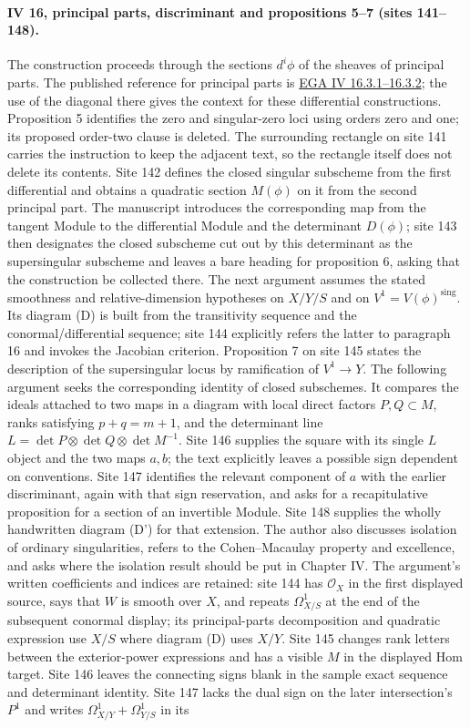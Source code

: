\documentclass[10pt,a4paper]{article}
\begin{document}
\paragraph{IV 16, principal parts, discriminant and propositions 5--7 (sites 141--148).}
The construction proceeds through the sections $d^i\phi$ of the sheaves of principal parts. The published reference for principal parts is \href{https://www.numdam.org/articles/10.1007/BF02732123/}{EGA IV 16.3.1--16.3.2}; the use of the diagonal there gives the context for these differential constructions. Proposition 5 identifies the zero and singular-zero loci using orders zero and one; its proposed order-two clause is deleted. The surrounding rectangle on site 141 carries the instruction to keep the adjacent text, so the rectangle itself does not delete its contents. Site 142 defines the closed singular subscheme from the first differential and obtains a quadratic section $M(\phi)$ on it from the second principal part. The manuscript introduces the corresponding map from the tangent Module to the differential Module and the determinant $D(\phi)$; site 143 then designates the closed subscheme cut out by this determinant as the supersingular subscheme and leaves a bare heading for proposition 6, asking that the construction be collected there. The next argument assumes the stated smoothness and relative-dimension hypotheses on $X/Y/S$ and on $V^1=V(\phi)^{\mathrm{sing}}$. Its diagram (D) is built from the transitivity sequence and the conormal/differential sequence; site 144 explicitly refers the latter to paragraph 16 and invokes the Jacobian criterion. Proposition 7 on site 145 states the description of the supersingular locus by ramification of $V^1\longrightarrow Y$. The following argument seeks the corresponding identity of closed subschemes. It compares the ideals attached to two maps in a diagram with local direct factors $P,Q\subset M$, ranks satisfying $p+q=m+1$, and the determinant line $L=\det P\otimes\det Q\otimes\det M^{-1}$. Site 146 supplies the square with its single $L$ object and the two maps $a,b$; the text explicitly leaves a possible sign dependent on conventions. Site 147 identifies the relevant component of $a$ with the earlier discriminant, again with that sign reservation, and asks for a recapitulative proposition for a section of an invertible Module. Site 148 supplies the wholly handwritten diagram (D') for that extension. The author also discusses isolation of ordinary singularities, refers to the Cohen--Macaulay property and excellence, and asks where the isolation result should be put in Chapter IV. The argument's written coefficients and indices are retained: site 144 has $\mathcal O_X$ in the first displayed source, says that $W$ is smooth over $X$, and repeats $\Omega^1_{X/S}$ at the end of the subsequent conormal display; its principal-parts decomposition and quadratic expression use $X/S$ where diagram (D) uses $X/Y$. Site 145 changes rank letters between the exterior-power expressions and has a visible $M$ in the displayed Hom target. Site 146 leaves the connecting signs blank in the sample exact sequence and determinant identity. Site 147 lacks the dual sign on the later intersection's $P^1$ and writes $\Omega^1_{X/Y}+\Omega^1_{Y/S}$ in its 
\end{document}
